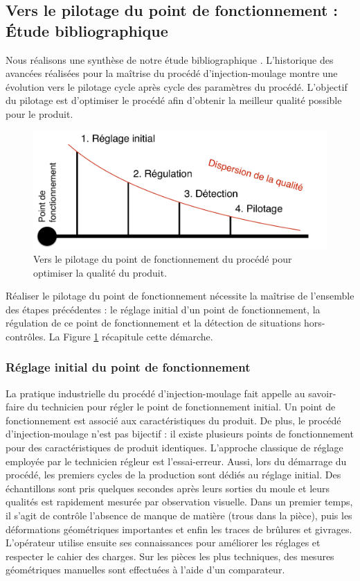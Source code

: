 \subsection{Vers le pilotage du point de fonctionnement : Étude bibliographique}
Nous réalisons une synthèse de notre étude bibliographique  \cite{nagorny_injection_2017}.
L'historique des avancées réalisées pour la maîtrise du procédé d'injection-moulage montre une évolution vers le pilotage cycle après cycle des paramètres du procédé.
L'objectif du pilotage est d'optimiser le procédé afin d'obtenir la meilleur qualité possible pour le produit.
\begin{figure}[hbtp]
	\centering
	\includegraphics[width=\textwidth,height=\textheight,keepaspectratio]{../Chap1/Figures/Sapristi_EtatArt_Pilotage_en_Injection_Plastique.pdf}
	\caption{Vers le pilotage du point de fonctionnement du procédé pour optimiser la qualité du produit.}
	\label{fig:vers_le_pilotage}
\end{figure}
Réaliser le pilotage du point de fonctionnement nécessite la maîtrise de l'ensemble des étapes précédentes : le réglage initial d'un point de fonctionnement, la régulation de ce point de fonctionnement et la détection de situations hors-contrôles.
La Figure \ref{fig:vers_le_pilotage} récapitule cette démarche.

\subsubsection{Réglage initial du point de fonctionnement}
La pratique industrielle du procédé d'injection-moulage fait appelle au savoir-faire du technicien pour régler le point de fonctionnement initial.
Un point de fonctionnement est associé aux caractéristiques du produit.
De plus, le procédé d'injection-moulage n'est pas bijectif : il existe plusieurs points de fonctionnement pour des caractéristiques de produit identiques.
L’approche classique de réglage employée par le technicien régleur est l’essai-erreur.
Aussi, lors du démarrage du procédé, les premiers cycles de la production sont dédiés au réglage initial.
Des échantillons sont pris quelques secondes après leurs sorties du moule et leurs qualités est rapidement mesurée par observation visuelle.
Dans un premier temps, il s'agit de contrôle l'absence de manque de matière (trous dans la pièce), puis les déformations géométriques importantes et enfin les traces de brûlures et givrages.
L’opérateur utilise ensuite ses connaissances pour améliorer les réglages et respecter le cahier des charges.
Sur les pièces les plus techniques, des mesures géométriques manuelles sont effectuées à l'aide d'un comparateur.

